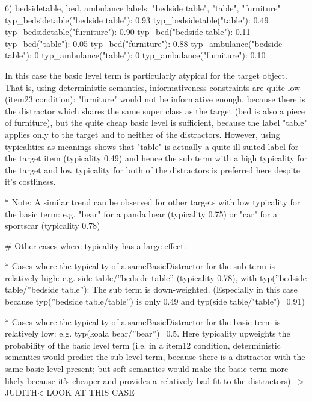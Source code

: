 6) bedsidetable, bed, ambulance
	labels: "bedside table", "table", "furniture"
	typ_bedsidetable("bedside table"): 0.93
	typ_bedsidetable("table"): 0.49
	typ_bedsidetable("furniture"): 0.90
	typ_bed("bedside table"): 0.11
	typ_bed("table"): 0.05
	typ_bed("furniture"): 0.88
	typ_ambulance("bedside table"): 0
	typ_ambulance("table"): 0
	typ_ambulance("furniture"): 0.10

	In this case the basic level term is particularly atypical for the target object. That is, using deterministic semantics, informativeness constraints are quite low (item23 condition): "furniture" would not be informative enough, because there is the distractor which shares the same super class as the target (bed is also a piece of furniture), but the quite cheap basic level is sufficient, because the label "table" applies only to the target and to neither of the distractors. However, using typicalities as meanings shows that "table" is actually a quite ill-suited label for the target item (typicality 0.49) and hence the sub term with a high typicality for the target and low typicality for both of the distractors is preferred here despite it's costliness.

	* Note: A similar trend can be observed for other targets with low typicality for the basic term: e.g. "bear" for a panda bear (typicality 0.75) or "car" for a sportscar (typicality 0.78)



	# Other cases where typicality has a large effect:

	* Cases where the typicality of a sameBasicDistractor for the sub term is relatively high: e.g. side table/”bedside table” (typicality 0.78), with typ(”bedside table/”bedside table”): The sub term is down-weighted. (Especially in this case because typ(”bedside table/table”) is only 0.49 and typ(side table/"table")=0.91)

	* Cases where the typicality of a sameBasicDistractor for the basic term is relatively low: e.g. typ(koala bear/”bear”)=0.5. Here typicality upweights the probability of the basic level term (i.e. in a item12 condition, deterministic semantics would predict the sub level term, because there is a distractor with the same basic level present; but soft semantics would make the basic term more likely because it's cheaper and provides a relatively bad fit to the distractors) --> JUDITH< LOOK AT THIS CASE


